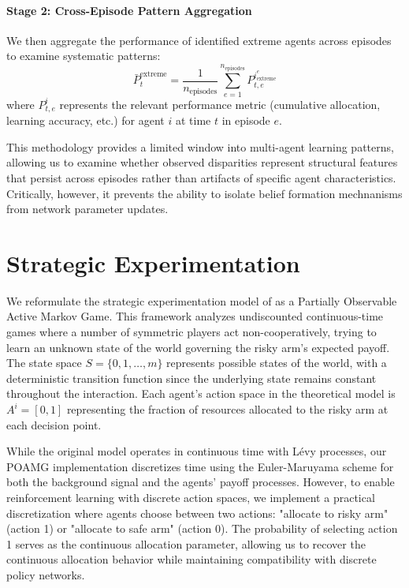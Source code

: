 \paragraph{Stage 2: Cross-Episode Pattern Aggregation} We then aggregate the performance of identified extreme agents across episodes to examine systematic patterns:
\begin{equation}
    \bar{P}_t^{\text{extreme}} = \frac{1}{n_{\text{episodes}}} \sum_{e=1}^{n_{\text{episodes}}} P_{t,e}^{i_{\text{extreme}}^e}
\end{equation}
where $P_{t,e}^i$ represents the relevant performance metric (cumulative allocation, learning accuracy, etc.) for agent $i$ at time $t$ in episode $e$.

This methodology provides a limited window into multi-agent learning patterns, allowing us to examine whether observed disparities represent structural features that persist across episodes rather than artifacts of specific agent characteristics. Critically, however, it prevents the ability to isolate belief formation mechnanisms from network parameter updates.


\section{Strategic Experimentation}

We reformulate the strategic experimentation model of \citet{keller2020undiscounted} as a Partially Observable Active Markov Game. This framework analyzes undiscounted continuous-time games where a number of symmetric players act non-cooperatively, trying to learn an unknown state of the world governing the risky arm's expected payoff. The state space $S = \{0,1,\ldots,m\}$ represents possible states of the world, with a deterministic transition function since the underlying state remains constant throughout the interaction. Each agent's action space in the theoretical model is $A^i = [0,1]$ representing the fraction of resources allocated to the risky arm at each decision point.

While the original model operates in continuous time with Lévy processes, our POAMG implementation discretizes time using the Euler-Maruyama scheme \citep{kloeden1992numerical, platen1999introduction} for both the background signal and the agents' payoff processes. However, to enable reinforcement learning with discrete action spaces, we implement a practical discretization where agents choose between two actions: "allocate to risky arm" (action 1) or "allocate to safe arm" (action 0). The probability of selecting action 1 serves as the continuous allocation parameter, allowing us to recover the continuous allocation behavior while maintaining compatibility with discrete policy networks.

